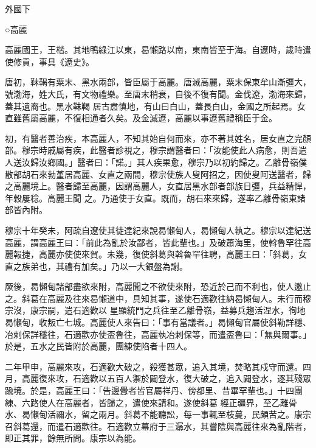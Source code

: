 
\begin{pinyinscope}

 外國下



 ○高麗



 高麗國王，王楷。其地鴨綠江以東，曷懶路以南，東南皆至于海。自遼時，歲時遣使修貢，事具《遼史》。



 唐初，靺鞨有粟末、黑水兩部，皆臣屬于高麗。唐滅高麗，粟末保東牟山漸彊大，號渤海，姓大氏，有文物禮樂。至唐末稍衰，自後不復有聞。金伐遼，渤海來歸，蓋其遺裔也。黑水靺鞨
 居古肅慎地，有山曰白山，蓋長白山，金國之所起焉。女直雖舊屬高麗，不復相通者久矣。及金滅遼，高麗以事遼舊禮稱臣于金。



 初，有醫者善治疾，本高麗人，不知其始自何而來，亦不著其姓名，居女直之完顏部。穆宗時戚屬有疾，此醫者診視之，穆宗謂醫者曰：「汝能使此人病愈，則吾遣人送汝歸汝鄉國。」醫者曰：「諾。」其人疾果愈，穆宗乃以初約歸之。乙離骨嶺僕散部胡石來勃堇居高麗、女直之兩間，穆宗使族人叟阿招之，因使叟阿送醫者，歸之高麗境上。醫者歸至高麗，因謂高麗人，女直居黑水部者部族日彊，兵益精悍，年穀屢稔。高麗王聞
 之。乃通使于女直。既而，胡石來來歸，遂率乙離骨嶺東諸部皆內附。



 穆宗十年癸未，阿疏自遼使其徒達紀來說曷懶甸人，曷懶甸人執之。穆宗以達紀送高麗，謂高麗王曰：「前此為亂於汝鄙者，皆此輩也。」及破蕭海里，使斡魯罕往高麗報捷，高麗亦使使來賀。未幾，復使斜葛與斡魯罕往聘，高麗王曰：「斜葛，女直之族弟也，其禮有加矣。」乃以一大銀盤為謝。



 厥後，曷懶甸諸部盡欲來附，高麗聞之不欲使來附，恐近於己而不利也，使人邀止之。斜葛在高麗及往來曷懶道中，具知其事，遂使石適歡往納曷懶甸人。未行而穆宗沒，康宗嗣，遣石適歡以
 星顯統門之兵往至乙離骨嶺，益募兵趨活涅水，徇地曷懶甸，收叛亡七城。高麗使人來告曰：「事有當議者。」曷懶甸官屬使斜勒詳穩、冶剌保詳穩往，石適歡亦使盃魯往，高麗執冶剌保等，而遣盃魯曰：「無與爾事。」於是，五水之民皆附於高麗，團練使陷者十四人。



 二年甲申，高麗來攻，石適歡大破之，殺獲甚眾，追入其境，焚略其戍守而還。四月，高麗復來攻，石適歡以五百人禦於闢登水，復大破之，追入闢登水，逐其殘眾踰境。於是，高麗王曰：「告邊釁者皆官屬祥丹、傍都里、昔畢罕輩也。」十四團練、六路使人在高麗者，皆歸之，遣使來請和。遂使斜葛
 經正疆界，至乙離骨水、曷懶甸活禰水，留之兩月。斜葛不能聽訟，每一事輒至枝蔓，民頗苦之。康宗召斜葛還，而遣石適歡往。石適歡立幕府于三潺水，其嘗陰與高麗往來為亂階者，即正其罪，餘無所問。康宗以為能。




\end{pinyinscope}
